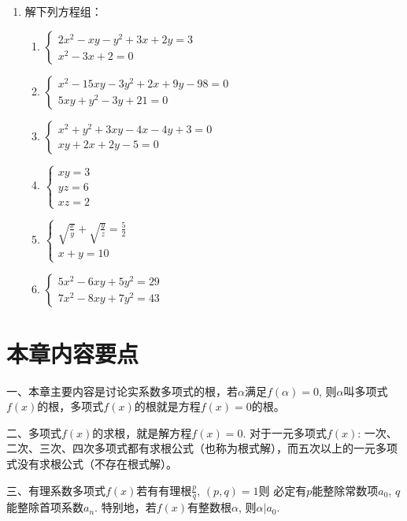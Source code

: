 \begin{enumerate}
\item 解下列方程组：
\begin{enumerate}
    \item $\begin{cases}
      2x^2-xy-y^2+3x+2y=3\\
      x^2-3x+2=0  
    \end{cases}$
    \item $\begin{cases}
        x^2-15xy-3y^2+2x+9y-98=0\\
        5xy+y^2-3y+21=0
    \end{cases}$
    \item $\begin{cases}
        x^2+y^2+3xy-4x-4y+3=0\\
        xy+2x+2y-5=0
    \end{cases}$
    \item $\begin{cases}
        xy=3\\yz=6\\xz=2
    \end{cases}$
    \item $\begin{cases}
        \sqrt{\frac{x}{y}}+\sqrt{\frac{y}{z}}=\frac{5}{2}\\
        x+y=10
    \end{cases}$
    \item $\begin{cases}
        5x^2-6xy+5y^2=29\\
        7x^2-8xy+7y^2=43
    \end{cases}$
\end{enumerate}


\end{enumerate}

\section*{本章内容要点}


一、本章主要内容是讨论实系数多项式的根，若$\alpha$满足$f(\alpha)=0$, 则$\alpha$叫多项式$f(x)$的根，多项式$f(x)$的根就是方程$f(x)=0$的根。

二、多项式$f(x)$的求根，就是解方程$f(x)=0$. 对于一元多项式$f(x)$: 一次、二次、三次、四次多项式都有求根公式（也称为根式解），而五次以上的一元多项式没有求根公式（不存在根式解）。

三、有理系数多项式$f(x)$若有有理根$\frac{p}{q}$, $(p,q)=1$则
必定有$p$能整除常数项$a_0$, $q$能整除首项系数$a_n$. 特别地，若$f(x)$有整数根$\alpha$, 则$\alpha|a_0$. 

